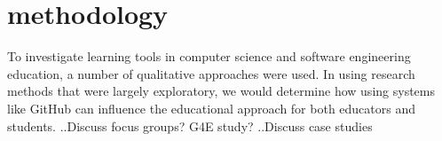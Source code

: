 \section{methodology}

To investigate learning tools in computer science and software engineering education, a number of qualitative approaches were used. In using research methods that were largely exploratory, we would determine how using systems like GitHub can influence the educational approach for both educators and students.
..Discuss focus groups? G4E study?
..Discuss case studies
